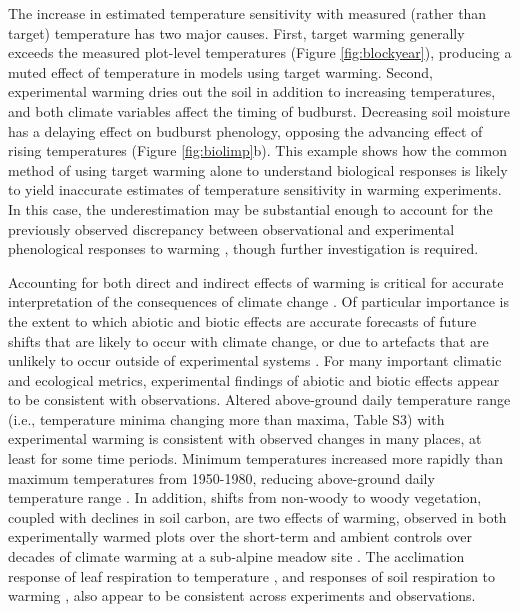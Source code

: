 \documentclass{article}
\begin{document}
\par The increase in estimated temperature sensitivity with measured (rather than target) temperature has two major causes. First, target warming generally exceeds the measured plot-level temperatures (Figure \ref{fig:blockyear}), producing a muted effect of temperature in models using target warming. Second, experimental warming dries out the soil in addition to increasing temperatures, and both climate variables affect the timing of budburst. %
Decreasing soil moisture has a delaying effect on budburst phenology, opposing the advancing effect of rising temperatures (Figure \ref{fig:biolimp}b). This example shows how the common method of using target warming alone to understand biological responses is likely to yield inaccurate estimates of temperature sensitivity in warming experiments. In this case, the underestimation may be substantial enough to account for the previously observed discrepancy between observational and experimental phenological responses to warming \citep{wolkovich2012}, though further investigation is required. 

\par Accounting for both direct and indirect effects of warming is critical for accurate interpretation of the consequences of climate change \citep{kharouba2015}.
Of particular importance is the extent to which abiotic and biotic effects are accurate forecasts of future shifts that are likely to occur with climate change, or due to artefacts that are unlikely to occur outside of experimental systems \citep{moise2010,diamond2013}. For many important climatic and ecological metrics, experimental findings of abiotic and biotic effects appear to be consistent with observations. Altered above-ground daily temperature range (i.e., temperature minima changing more than maxima, Table S3) with experimental warming is consistent with observed changes in many places, at least for some time periods. Minimum temperatures increased more rapidly than maximum temperatures from 1950-1980, reducing above-ground daily temperature range \citep [though the temperature trends have been largely insignificant from 1980 onward] []{thorne2016,vose2005}. In addition, shifts from non-woody to woody vegetation, coupled with declines in soil carbon, are two effects of warming, observed in both experimentally warmed plots over the short-term and ambient controls over decades of climate warming at a sub-alpine meadow site \citep{harte2015}. The acclimation response of leaf respiration to temperature \citep{aspinwall2016,reich2016}, and responses of soil respiration to warming \citep{carey2016}, also appear to be consistent across experiments and observations.
\end{document}
